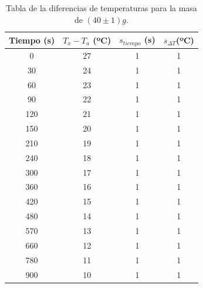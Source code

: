 \documentclass[a4paper]{article}
\begin{document}
\begin{table}[H]
  \centering
    \begin{tabular}{|c|c|c|c|} \hline
    Tiempo (s) & $T_x - T_a$ (ºC) & $s_{tiempo }$ (s) &  $s_{ \Delta T} $(ºC) \\ \hline
    0     & 27    & 1     & 1 \\ \hline
    30    & 24    & 1     & 1 \\ \hline
    60    & 23    & 1     & 1 \\ \hline
    90    & 22    & 1     & 1 \\ \hline
    120   & 21    & 1     & 1 \\ \hline
    150   & 20    & 1     & 1 \\ \hline
    210   & 19    & 1     & 1 \\ \hline
    240   & 18    & 1     & 1 \\ \hline
    300   & 17    & 1     & 1 \\ \hline
    360   & 16    & 1     & 1 \\ \hline
    420   & 15    & 1     & 1 \\ \hline
    480   & 14    & 1     & 1 \\ \hline
    570   & 13    & 1     & 1 \\ \hline
    660   & 12    & 1     & 1 \\ \hline
    780   & 11    & 1     & 1 \\ \hline
    900   & 10    & 1     & 1 \\ \hline
    \end{tabular}%
  \caption{Tabla de la diferencias de temperaturas para la masa de $(40\pm 1)g$.}
\end{table}%
\end{document}
